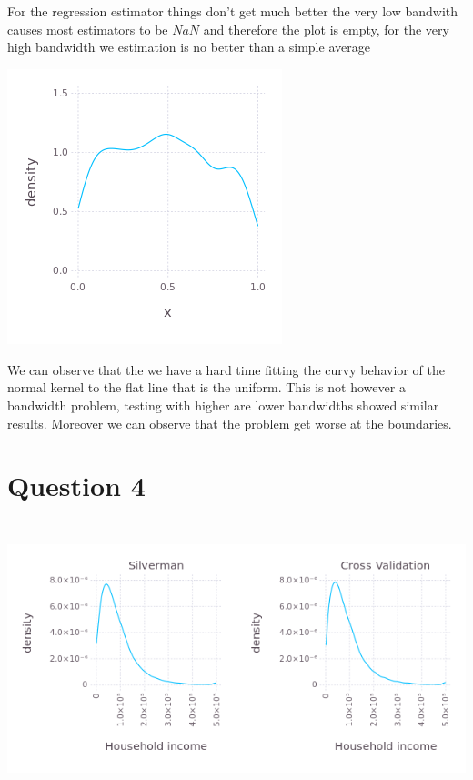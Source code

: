 \documentclass{article}
\begin{document}
For the regression estimator things don't get much better the very low bandwith
causes most estimators to be $NaN$ and therefore the plot is empty, for the very
high bandwidth we estimation is no better than a simple average

\begin{center}
\includegraphics[width=8cm, height=8cm]{Q3-c.png}
\end{center}

We can observe that the we have a hard time fitting the curvy behavior of
the normal kernel to the flat line that is the uniform. This is not however a 
bandwidth problem, testing with higher are lower bandwidths showed similar results.
Moreover we can observe that the problem get worse at the boundaries.

\section{Question 4}

\begin{center}
\includegraphics[width=16cm, height=8cm]{Q4-ab.png}
\end{center}
\end{document}
